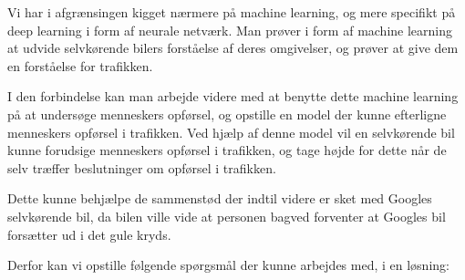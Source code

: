 Vi har i afgrænsingen kigget nærmere på machine learning, og mere specifikt på deep learning i form af neurale netværk. Man prøver i form af machine learning at udvide selvkørende bilers forståelse af deres omgivelser, og prøver at give dem en forståelse for trafikken. 

I den forbindelse kan man arbejde videre med at benytte dette machine learning på at undersøge menneskers opførsel, og opstille en model der kunne efterligne menneskers opførsel i trafikken. Ved hjælp af denne model vil en selvkørende bil kunne forudsige menneskers opførsel i trafikken, og tage højde for dette når de selv træffer beslutninger om opførsel i trafikken. 

Dette kunne behjælpe de sammenstød der indtil videre er sket med Googles selvkørende bil, da bilen ville vide at personen bagved forventer at Googles bil forsætter ud i det gule kryds.

Derfor kan vi opstille følgende spørgsmål der kunne arbejdes med, i en løsning:


\vspace{10 mm}
\noindent{}
